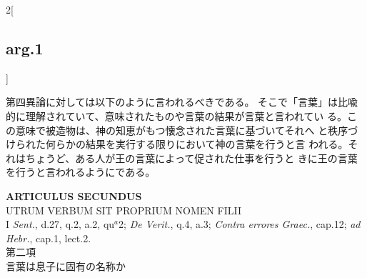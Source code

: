\documentclass[paper=a4paper,fontsize=10pt,jafontsize=9pt,titlepage]{jlreq}
\begin{document}
\begin{paracol}{2}[\subsection{arg.1}]
\switchcolumn

第四異論に対しては以下のように言われるべきである。
そこで「言葉」は比喩的に理解されていて、意味されたものや言葉の結果が言葉と言われてい
 る。この意味で被造物は、神の知恵がもつ懐念された言葉に基づいてそれへ
 と秩序づけられた何らかの結果を実行する限りにおいて神の言葉を行うと言
 われる。それはちょうど、ある人が王の言葉によって促された仕事を行うと
 きに王の言葉を行うと言われるようにである。

\end{paracol}

\newpage


\begin{center}
{\Large {\bfseries ARTICULUS SECUNDUS}}\\
{\large UTRUM VERBUM SIT PROPRIUM NOMEN FILII}\\
{\footnotesize I {\itshape Sent.}, d.27, q.2, a.2, qu$^{a}$2;
 {\itshape De Verit.}, q.4, a.3; {\itshape Contra errores Graec.},
 cap.12; {\itshape ad Hebr.}, cap.1, lect.2.}\\
{\Large 第二項\\言葉は息子に固有の名称か}
\end{center}


{}
\setcounter{section}{2}
\setcounter{subsection}{0}
\end{document}
